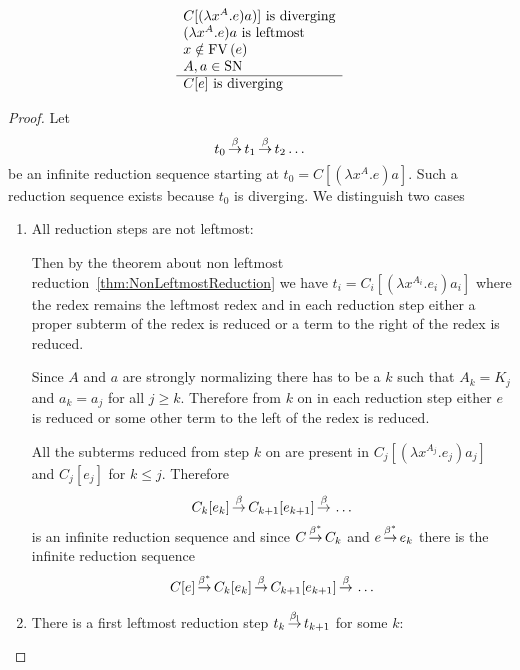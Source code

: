 \begin{theorem}
    $$
    \begin{array}{l} 
        C[(\lambda x^A. e) a)] \text{ is diverging}
        \\
        (\lambda x^A. e) a \text{ is leftmost}
        \\
        x \notin \text{FV}\,(e)
        \\
        A, a \in {\text{SN}}
     \\ \hline 
        C[e] \text{ is diverging}
    \end{array}
    $$
    \begin{proof}
        Let
        $$
        t_0 {\,\stackrel{\beta}{\to}\,} t_1 {\,\stackrel{\beta}{\to}\,} t_2 \ldots
        $$
        be an infinite reduction sequence starting at $t_0 = C[(\lambda x^A.e)
        a]$. Such a reduction sequence exists because $t_0$ is diverging. We
        distinguish two cases
        \begin{enumerate}
            \item All reduction steps are not leftmost:

                Then by the theorem
                about non leftmost reduction~\ref{thm:NonLeftmostReduction} we
                have $t_i = C_i[(\lambda x^{A_i}. e_i) a_i]$ where the redex
                remains the leftmost redex and in each reduction step either a
                proper subterm of the redex is reduced or a term to the
                right of the redex is reduced.

                Since $A$ and $a$ are strongly normalizing there has to be a $k$
                such that $A_k = K_j $ and $a_k = a_j$ for all $j \ge k$.
                Therefore from $k$ on in each reduction step either $e$ is
                reduced or some other term to the left of the redex is reduced.

                All the subterms reduced from step $k$ on are present in
                $C_j[(\lambda x^{A_j}. e_j) a_j]$ and $C_j[e_j]$ for $k \le j$.
                Therefore
                $$
                C_k[e_k] {\,\stackrel{\beta}{\to}\,} C_{k+1}[e_{k+1}] {\,\stackrel{\beta}{\to}\,} \ldots
                $$
                is an infinite reduction sequence and since $C {\,\stackrel{\beta^*}{\to}\,}
                C_k$ and $e {\,\stackrel{\beta^*}{\to}\,} e_k$ there is the infinite reduction
                sequence
                $$
                C[e] {\,\stackrel{\beta^*}{\to}\,}
                C_k[e_k] {\,\stackrel{\beta}{\to}\,} C_{k+1}[e_{k+1}] {\,\stackrel{\beta}{\to}\,} \ldots
                $$

            \item There is a first leftmost reduction step $t_k {\,\stackrel{{\beta_{\text{l}}}}{\to}\,} t_{k+1}$ for some $k$:


\end{enumerate}
\end{proof}
\end{theorem}
